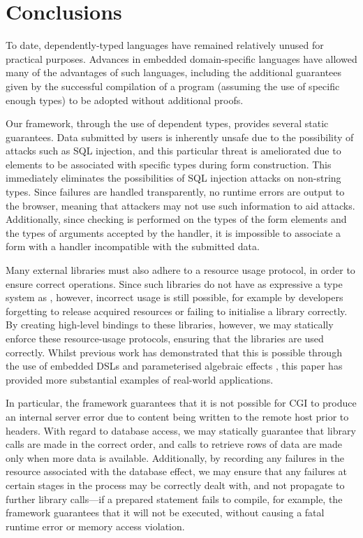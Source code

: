 
\section{Conclusions}

To date,
dependently-typed languages have remained relatively unused for practical
purposes. Advances in embedded domain-specific languages
have allowed many of the advantages of such languages, including the additional
guarantees given by the successful compilation of a program (assuming the use
of specific enough types) to be adopted without additional proofs.

Our framework, through the use of dependent types, provides several static
guarantees. Data submitted by users is inherently unsafe due to the possibility
of attacks such as SQL injection, and this particular threat is ameliorated due
to elements to be associated with specific types during form construction. This
immediately eliminates the possibilities of SQL injection attacks on non-string
types. Since failures are handled transparently, no runtime errors are output
to the browser, meaning that attackers may not use such information to aid
attacks. Additionally, since checking is performed on the types of the form
elements and the types of arguments accepted by the handler, it is impossible
to associate a form with a handler incompatible with the submitted data.

Many external libraries must also adhere to a resource usage protocol, in order to ensure correct operations. Since such libraries do not have as expressive a type system as \idris{}, however, incorrect usage is still possible, for example by developers forgetting to release acquired resources or failing to initialise a library correctly. By creating high-level bindings to these libraries, however, we may statically enforce these resource-usage protocols, ensuring that the libraries are used correctly. Whilst previous work has demonstrated that this is possible through the use of embedded DSLs \cite{brady:edsl} and parameterised algebraic effects \cite{brady:effects}, this paper has provided more substantial examples of real-world applications. 

In particular, the framework guarantees that it is not possible for CGI to produce an internal server error due to content being written to the remote host prior to headers. With regard to database access, we may statically guarantee that library calls are made in the correct order, and calls to retrieve rows of data are made only when more data is available. Additionally, by recording any failures in the resource associated with the database effect, we may ensure that any failures at certain stages in the process may be correctly dealt with, and not propagate to further library calls---if a prepared statement fails to compile, for example, the framework guarantees that it will not be executed, without causing a fatal runtime error or memory access violation.

